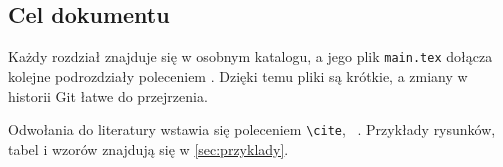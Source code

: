 \subsection{Cel dokumentu}

Każdy rozdział znajduje się w osobnym katalogu, a jego plik \texttt{main.tex}
dołącza kolejne podrozdziały poleceniem \verb||. Dzięki temu pliki są krótkie,
a zmiany w historii Git łatwe do przejrzenia.

Odwołania do literatury wstawia się poleceniem \verb|\cite|, \np{}~\cite{knuth1984texbook}.
Przykłady rysunków, tabel i wzorów znajdują się w \cref{sec:przyklady}.

